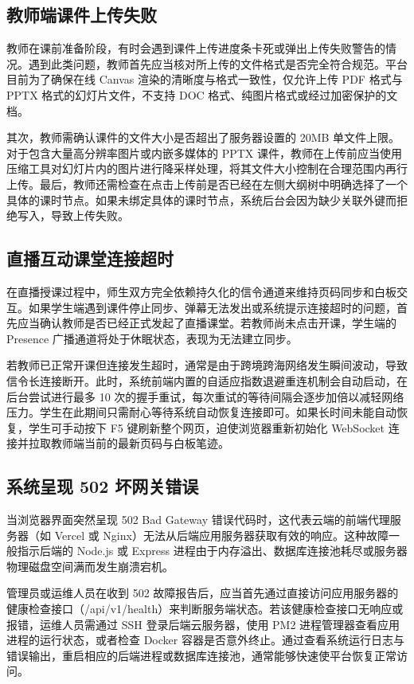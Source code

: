\subsection{教师端课件上传失败}

教师在课前准备阶段，有时会遇到课件上传进度条卡死或弹出上传失败警告的情况。遇到此类问题，教师首先应当核对所上传的文件格式是否完全符合规范。平台目前为了确保在线 Canvas 渲染的清晰度与格式一致性，仅允许上传 PDF 格式与 PPTX 格式的幻灯片文件，不支持 DOC 格式、纯图片格式或经过加密保护的文档。

其次，教师需确认课件的文件大小是否超出了服务器设置的 20MB 单文件上限。对于包含大量高分辨率图片或内嵌多媒体的 PPTX 课件，教师在上传前应当使用压缩工具对幻灯片内的图片进行降采样处理，将其文件大小控制在合理范围内再行上传。最后，教师还需检查在点击上传前是否已经在左侧大纲树中明确选择了一个具体的课时节点。如果未绑定具体的课时节点，系统后台会因为缺少关联外键而拒绝写入，导致上传失败。

\subsection{直播互动课堂连接超时}

在直播授课过程中，师生双方完全依赖持久化的信令通道来维持页码同步和白板交互。如果学生端遇到课件停止同步、弹幕无法发出或系统提示连接超时的问题，首先应当确认教师是否已经正式发起了直播课堂。若教师尚未点击开课，学生端的 Presence 广播通道将处于休眠状态，表现为无法建立同步。

若教师已正常开课但连接发生超时，通常是由于跨境跨海网络发生瞬间波动，导致信令长连接断开。此时，系统前端内置的自适应指数退避重连机制会自动启动，在后台尝试进行最多 10 次的握手重试，每次重试的等待间隔会逐步加倍以减轻网络压力。学生在此期间只需耐心等待系统自动恢复连接即可。如果长时间未能自动恢复，学生可手动按下 F5 键刷新整个网页，迫使浏览器重新初始化 WebSocket 连接并拉取教师端当前的最新页码与白板笔迹。

\subsection{系统呈现 502 坏网关错误}

当浏览器界面突然呈现 502 Bad Gateway 错误代码时，这代表云端的前端代理服务器（如 Vercel 或 Nginx）无法从后端应用服务器获取有效的响应。这种故障一般指示后端的 Node.js 或 Express 进程由于内存溢出、数据库连接池耗尽或服务器物理磁盘空间满而发生崩溃宕机。

管理员或运维人员在收到 502 故障报告后，应当首先通过直接访问应用服务器的健康检查接口（/api/v1/health）来判断服务端状态。若该健康检查接口无响应或报错，运维人员需通过 SSH 登录后端云服务器，使用 PM2 进程管理器查看应用进程的运行状态，或者检查 Docker 容器是否意外终止。通过查看系统运行日志与错误输出，重启相应的后端进程或数据库连接池，通常能够快速使平台恢复正常访问。

